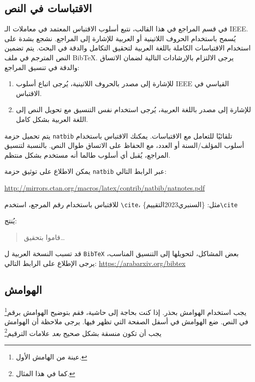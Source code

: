 \documentclass[12pt]{article}
\begin{document}
\subsection{الاقتباسات في النص}

في قسم المراجع في هذا القالب، نتبع أسلوب الاقتباس المعتمد في معاملات الـ IEEE. يُسمح باستخدام الحروف اللاتينية أو العربية للإشارة إلى المراجع. نشجع بشدة على استخدام الاقتباسات الكاملة باللغة العربية لتحقيق التكامل والدقة في البحث. يتم تضمين النص المترجم في ملف BibTeX. يرجى الالتزام بالإرشادات التالية لضمان الاتساق والدقة في تنسيق المراجع:

\begin{enumerate}
  \item للإشارة إلى مصدر بالحروف اللاتينية، يُرجى اتباع أسلوب IEEE القياسي في الاقتباس.
  \item للإشارة إلى مصدر باللغة العربية، يُرجى استخدام نفس التنسيق مع تحويل النص إلى اللغة العربية بشكل كامل.
\end{enumerate}

يتم تحميل حزمة \verb|natbib| تلقائيًا للتعامل مع الاقتباسات. يمكنك الاقتباس باستخدام أسلوب المؤلف/السنة أو العدد، مع الحفاظ على الاتساق طوال النص. بالنسبة لتنسيق المراجع، يُقبل أي أسلوب طالما أنه مستخدم بشكل منتظم.

يمكن الاطلاع على توثيق حزمة \verb|natbib| عبر الرابط التالي:
\begin{center}
\url{http://mirrors.ctan.org/macros/latex/contrib/natbib/natnotes.pdf}
\end{center}


للاقتباس باستخدام رقم المرجع، استخدم \verb|\cite|، مثل:
\{\textarabic{السنبري2023التقييم}\}\verb|\cite|

يُنتج:
\begin{quote}
\cite{السنبري2023التقييم} قاموا بتحقيق\dots
\end{quote}

قد تسبب النسخة العربية ل \verb|BibTeX| بعض المشاكل، لتحويلها إلى التنسيق المناسب، يرجى الإطلاع على الرابط التالي: 
\url{https://arabarxiv.org/bibtex}

\subsection{الهوامش}
يجب استخدام الهوامش بحذر. إذا كنت بحاجة إلى حاشية، فقم بتوضيح الهوامش برقم\footnote{عينة من الهامش الأول.} في النص. ضع الهوامش في أسفل الصفحة التي تظهر فيها. يرجى ملاحظة أن الهوامش يجب أن تكون منسقة بشكل صحيح \emph{بعد} علامات الترقيم\footnote{كما في هذا المثال.}
\end{document}

